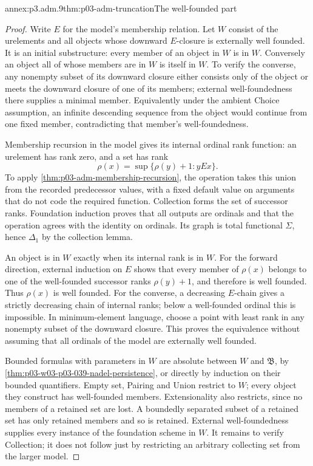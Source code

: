 \begin{annexitem}{annex:p3.adm.9}{thm:p03-adm-truncation}{The well-founded part}
\begin{proof}
Write \(E\) for the model's membership relation. Let \(W\) consist
of the urelements and all objects whose downward \(E\)-closure is
externally well founded. It is an initial substructure: every member
of an object in \(W\) is in \(W\). Conversely an object all of whose
members are in \(W\) is itself in \(W\). To verify the converse, any
nonempty subset of its downward closure either consists only of the
object or meets the downward closure of one of its members; external
well-foundedness there supplies a minimal member. Equivalently under
the ambient Choice assumption, an infinite descending sequence from
the object would continue from one fixed member, contradicting that
member's well-foundedness.

Membership recursion in the model gives its internal ordinal rank
function: an urelement has rank zero, and a set has rank
\[
 \rho(x)=\sup\{\rho(y)+1:yEx\}.
\]
To apply \cref{thm:p03-adm-membership-recursion}, the operation takes
this union from the recorded predecessor values, with a fixed default
value on arguments that do not code the required function. Collection
forms the set of successor ranks. Foundation induction proves that
all outputs are ordinals and that the operation agrees with the identity
on ordinals. Its graph is total functional \(\Sigma\), hence
\(\Delta_1\) by the collection lemma.

An object is in \(W\) exactly when its internal rank is in \(W\).
For the forward direction, external induction on \(E\) shows that
every member of \(\rho(x)\) belongs to one of the well-founded successor
ranks \(\rho(y)+1\), and therefore is well founded. Thus \(\rho(x)\)
is well founded. For the converse, a decreasing \(E\)-chain gives a
strictly decreasing chain of internal ranks; below a well-founded ordinal
this is impossible. In minimum-element language, choose a point with
least rank in any nonempty subset of the downward closure. This proves
the equivalence without assuming that all ordinals of the model are
externally well founded.

Bounded formulas with parameters in \(W\) are absolute between \(W\)
and \(\mathfrak B\), by
\cref{thm:p03-w03-p03-039-nadel-persistence}, or directly by induction
on their bounded quantifiers. Empty set, Pairing and Union restrict to
\(W\); every object they construct has well-founded members.
Extensionality also restricts, since no members of a retained set are
lost. A boundedly separated subset of a retained set has only retained
members and so is retained. External well-foundedness supplies every
instance of the foundation scheme in \(W\). It remains to verify
Collection; it does not follow just by restricting an arbitrary
collecting set from the larger model.


\end{proof}
\end{annexitem}
